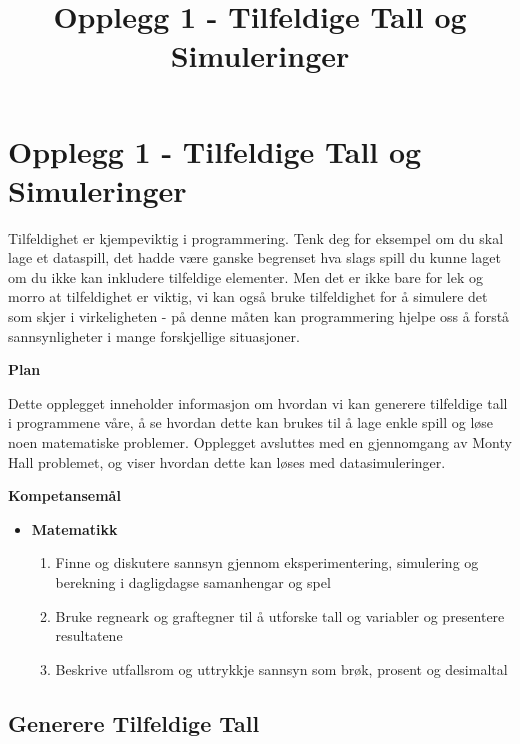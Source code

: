\documentclass[11pt]{article}
\title{Opplegg 1 - Tilfeldige Tall og Simuleringer}
\providecommand{\tightlist}{%
      \setlength{\itemsep}{0pt}\setlength{\parskip}{0pt}}
\begin{document}
    
    
    \maketitle
    
    

    
    \section{Opplegg 1 - Tilfeldige Tall og
Simuleringer}\label{opplegg-1---tilfeldige-tall-og-simuleringer}

Tilfeldighet er kjempeviktig i programmering. Tenk deg for eksempel om
du skal lage et dataspill, det hadde være ganske begrenset hva slags
spill du kunne laget om du ikke kan inkludere tilfeldige elementer. Men
det er ikke bare for lek og morro at tilfeldighet er viktig, vi kan også
bruke tilfeldighet for å simulere det som skjer i virkeligheten - på
denne måten kan programmering hjelpe oss å forstå sannsynligheter i
mange forskjellige situasjoner.

\textbf{Plan}

Dette opplegget inneholder informasjon om hvordan vi kan generere
tilfeldige tall i programmene våre, å se hvordan dette kan brukes til å
lage enkle spill og løse noen matematiske problemer. Opplegget avsluttes
med en gjennomgang av Monty Hall problemet, og viser hvordan dette kan
løses med datasimuleringer.

\textbf{Kompetansemål}

\begin{itemize}
\tightlist
\item
  \textbf{Matematikk}

  \begin{enumerate}
  \def\labelenumi{\arabic{enumi}.}
  \tightlist
  \item
    Finne og diskutere sannsyn gjennom eksperimentering, simulering og
    berekning i dagligdagse samanhengar og spel
  \item
    Bruke regneark og graftegner til å utforske tall og variabler og
    presentere resultatene
  \item
    Beskrive utfallsrom og uttrykkje sannsyn som brøk, prosent og
    desimaltal
  \end{enumerate}
\end{itemize}

    

    \subsection{Generere Tilfeldige Tall}\label{generere-tilfeldige-tall}
\end{document}

